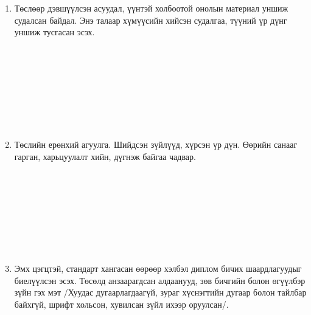\begin{titlepage}
	\begin{enumerate}
		\item Төслөөр дэвшүүлсэн асуудал, үүнтэй холбоотой онолын материал уншиж судалсан байдал. Энэ талаар хүмүүсийн хийсэн судалгаа, түүний үр дүнг уншиж тусгасан эсэх.
		      \begin{center}
			      \dotfill \\[0.1cm]
			      \dotfill \\[0.1cm]
			      \dotfill \\[0.1cm]
			      \dotfill \\[0.1cm]
			      \dotfill \\[0.1cm]
			      \dotfill \\[0.1cm]
			      \dotfill \\[0.4cm]
		      \end{center}
		\item Төслийн ерөнхий агуулга. Шийдсэн зүйлүүд, хүрсэн үр дүн. Өөрийн санааг гарган, харьцуулалт хийн, дүгнэж байгаа чадвар.
		      \begin{center}
			      \dotfill \\[0.1cm]
			      \dotfill \\[0.1cm]
			      \dotfill \\[0.1cm]
			      \dotfill \\[0.1cm]
			      \dotfill \\[0.1cm]
			      \dotfill \\[0.1cm]
			      \dotfill \\[0.4cm]
		      \end{center}
		\item Эмх цэгцтэй, стандарт хангасан өөрөөр хэлбэл диплом бичих шаардлагуудыг биелүүлсэн эсэх. Төсөлд анзаарагдсан алдаанууд, зөв бичгийн болон өгүүлбэр зүйн гэх мэт /Хуудас дугаарлагдаагүй, зураг хүснэгтийн дугаар болон тайлбар байхгүй, шрифт хольсон, хувилсан зүйл ихээр оруулсан/.
		      \begin{center}
			      \dotfill \\[0.1cm]
			      \dotfill \\[0.1cm]
			      \dotfill \\[0.1cm]
			      \dotfill \\[0.1cm]
			      \dotfill \\[0.1cm]
		      \end{center}
	\end{enumerate}
\end{titlepage}

\newpage

